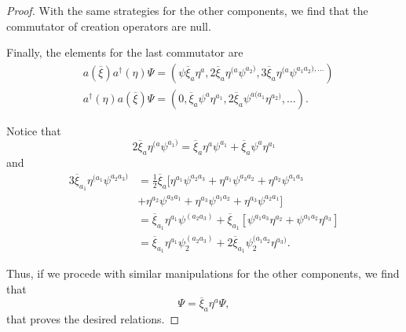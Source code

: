 \begin{proof}
    With the same strategies for the other components, we find that the commutator of creation operators are null.

    Finally, the elements for the last commutator are
    \begin{subequations}
        \begin{align}
            &a(\overline{\xi})a^{\dagger}(\eta)\Psi=\left(\psi\overline{\xi}_a\eta^a,2\overline{\xi}_a\eta^{(a}\psi^{a_2)},3\overline{\xi}_a\eta^{(a}\psi^{a_1a_2),\dots}\right)\\
            &a^{\dagger}(\eta)a(\overline{\xi})\Psi=\left(0,\overline{\xi}_a\psi^a\eta^{a_1},2\overline{\xi}_a\psi^{a(a_1}\eta^{a_2)},\dots\right).
        \end{align}
    \end{subequations}

    Notice that
    \begin{equation}
        2\overline{\xi}_a\eta^{(a}\psi^{a_1)}=\overline{\xi}_a\eta^a\psi^{a_1}+\overline{\xi}_a\psi^a\eta^{a_1}
    \end{equation}
    and
    \begin{subequations}
        \begin{align}
            3\overline{\xi}_{a_1}\eta^{(a_1}\psi^{a_2a_3)}&=\frac{1}{2}\overline{\xi}_a[\eta^{a_1}\psi^{a_2a_3}+\eta^{a_1}\psi^{a_3a_2}+\eta^{a_2}\psi^{a_1a_3}\\
            &+\eta^{a_2}\psi^{a_3a_1}+\eta^{a_3}\psi^{a_1a_2}+\eta^{a_3}\psi^{a_2a_1}]\\
            &=\overline{\xi}_{a_1}\eta^{a_1}\psi^{(a_2a_3)}+\overline{\xi}_{a_1}\left[\psi^{a_1a_3}\eta^{a_2}+\psi^{a_1a_2}\eta^{a_3}\right]\\
            &=\overline{\xi}_{a_1}\eta^{a_1}\psi_2^{(a_2a_3)}+2\overline{\xi}_{a_1}\psi_2^{(a_1a_2}\eta^{a_3)}.
        \end{align}
    \end{subequations}

    Thus, if we procede with similar manipulations for the other components, we find that
    \begin{equation}
        [a(\overline{\xi}),a^{\dagger}(\eta)]\Psi=\overline{\xi}_a\eta^a\Psi,
    \end{equation}
    that proves the desired relations.
\end{proof}